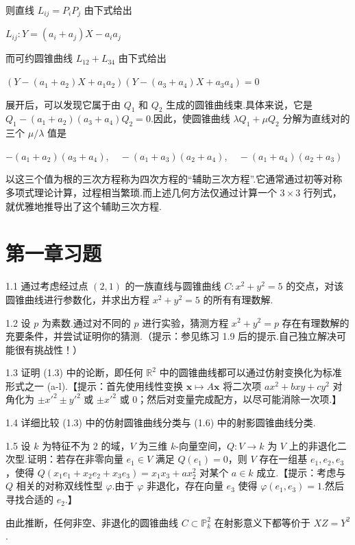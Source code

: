 则直线 \(L_{ij} = P_iP_j\) 由下式给出

\(
L_{ij}: Y = (a_i + a_j)X - a_i a_j
\)

而可约圆锥曲线 \(L_{12} + L_{34}\) 由下式给出

\(
(Y - (a_1+a_2)X + a_1a_2)(Y - (a_3+a_4)X + a_3a_4) = 0
\)

展开后，可以发现它属于由 \(Q_1\) 和 \(Q_2\) 生成的圆锥曲线束.具体来说，它是 \(Q_1 - (a_1+a_2)(a_3+a_4)Q_2 = 0\).因此，使圆锥曲线 \(\lambda Q_1 + \mu Q_2\) 分解为直线对的三个 \(\mu/\lambda\) 值是

\(
- (a_1+a_2)(a_3+a_4), \quad - (a_1+a_3)(a_2+a_4), \quad - (a_1+a_4)(a_2+a_3)
\)

以这三个值为根的三次方程称为四次方程的“辅助三次方程”.它通常通过初等对称多项式理论计算，过程相当繁琐.而上述几何方法仅通过计算一个 \(3 \times 3\) 行列式，就优雅地推导出了这个辅助三次方程.

\section{第一章习题}

1.1 通过考虑经过点 \((2,1)\) 的一族直线与圆锥曲线 \(C: x^2 + y^2 = 5\) 的交点，对该圆锥曲线进行参数化，并求出方程 \(x^2 + y^2 = 5\) 的所有有理数解.

1.2 设 \(p\) 为素数.通过对不同的 \(p\) 进行实验，猜测方程 \(x^2 + y^2 = p\) 存在有理数解的充要条件，并尝试证明你的猜测.（提示：参见练习 1.9 后的提示.自己独立解决可能很有挑战性！）

1.3 证明 (1.3) 中的论断，即任何 \(\mathbb{R}^2\) 中的圆锥曲线都可以通过仿射变换化为标准形式之一 (a-l).【提示：首先使用线性变换 \(\mathbf{x} \mapsto A\mathbf{x}\) 将二次项 \(ax^2 + bxy + cy^2\) 对角化为 \(\pm x'^2 \pm y'^2\) 或 \(\pm x'^2\) 或 0；然后对变量完成配方，以尽可能消除一次项.】

1.4 详细比较 (1.3) 中的仿射圆锥曲线分类与 (1.6) 中的射影圆锥曲线分类.

1.5 设 \(k\) 为特征不为 2 的域，\(V\) 为三维 \(k\)-向量空间，\(Q: V \to k\) 为 \(V\) 上的非退化二次型.证明：若存在非零向量 \(e_1 \in V\) 满足 \(Q(e_1) = 0\)，则 \(V\) 存在一组基 \(e_1, e_2, e_3\)，使得 \(Q(x_1 e_1 + x_2 e_2 + x_3 e_3) = x_1 x_3 + ax_2^2\) 对某个 \(a \in k\) 成立.【提示：考虑与 \(Q\) 相关的对称双线性型 \(\varphi\).由于 \(\varphi\) 非退化，存在向量 \(e_3\) 使得 \(\varphi(e_1, e_3) = 1\).然后寻找合适的 \(e_2\).】

由此推断，任何非空、非退化的圆锥曲线 \(C \subset \mathbb{P}_k^2\) 在射影意义下都等价于 \(XZ = Y^2\).

